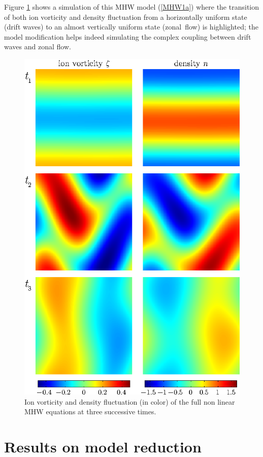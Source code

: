 \documentclass[12pt,lot, lof]{puthesis}
\begin{document}
Figure \ref{coupling} shows a simulation of this MHW model (\ref{MHW1a}) where the transition of both ion vorticity and density fluctuation from a horizontally uniform state (drift waves) to an almost  vertically uniform state (zonal~flow) is highlighted;  the model modification helps indeed simulating the complex coupling between drift waves and zonal flow. 
\begin{figure}[htb]
\centering
  \includegraphics{video}
  \caption{Ion vorticity and density fluctuation (in color) of the full non linear MHW equations at three successive times.}
\label{coupling}
\end{figure}

\section{Results on model reduction}
\end{document}
